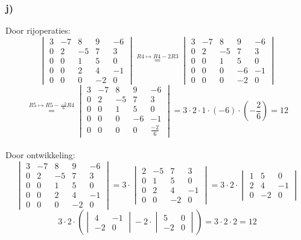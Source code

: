 \documentclass[10pt,a4paper]{article}
\begin{document}
\subsubsection*{j)}
Door rijoperaties:\\
\[
\begin{vmatrix}
3 & -7 & 8 & 9 & -6\\
0 & 2 & -5 & 7 & 3\\
0 & 0 & 1 & 5 & 0\\
0 & 0 & 2 & 4 & -1\\
0 & 0 & 0 & -2 & 0
\end{vmatrix}
\overset{R4 \longmapsto R4-2R3}{=}
\begin{vmatrix}
3 & -7 & 8 & 9 & -6\\
0 & 2 & -5 & 7 & 3\\
0 & 0 & 1 & 5 & 0\\
0 & 0 & 0 & -6 & -1\\
0 & 0 & 0 & -2 & 0
\end{vmatrix}
\]
\[
\overset{R5 \longmapsto R5-\frac{-2}{6}R4}{=}
\begin{vmatrix}
3 & -7 & 8 & 9 & -6\\
0 & 2 & -5 & 7 & 3\\
0 & 0 & 1 & 5 & 0\\
0 & 0 & 0 & -6 & -1\\
0 & 0 & 0 & 0 & \frac{-2}{6}
\end{vmatrix}
=
3\cdot 2 \cdot 1 \cdot (-6) \cdot (-\frac{2}{6}) = 12
\]\\
Door ontwikkeling:
\[
\begin{vmatrix}
3 & -7 & 8 & 9 & -6\\
0 & 2 & -5 & 7 & 3\\
0 & 0 & 1 & 5 & 0\\
0 & 0 & 2 & 4 & -1\\
0 & 0 & 0 & -2 & 0
\end{vmatrix}
=
3 \cdot
\begin{vmatrix}
2 & -5 & 7 & 3\\
0 & 1 & 5 & 0\\
0 & 2 & 4 & -1\\
0 & 0 & -2 & 0
\end{vmatrix}
=
3 \cdot 2 \cdot
\begin{vmatrix}
1 & 5 & 0\\
2 & 4 & -1\\
0 & -2 & 0
\end{vmatrix}
\]
\[
3\cdot 2\cdot \left( 
\begin{vmatrix}
4 & -1\\
-2 & 0
\end{vmatrix}
-2\cdot
\begin{vmatrix}
5 & 0\\
-2 & 0
\end{vmatrix}
\right)
=
3\cdot 2 \cdot 2 = 12
\]
\end{document}
